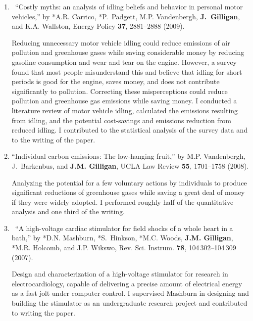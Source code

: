 \begin{enumerate}
\begin{credit}
	  \end{credit}
%	
	\item
	\textdagger\ 
	\enquote{Costly myths: an analysis of idling beliefs and behavior in personal
	  motor vehicles,}  by *A.R. Carrico, *P.~Padgett, M.P. Vandenbergh,
	  \textbf{J.~Gilligan}, and K.A. Wallston, Energy Policy \textbf{37}, 2881--2888
	  (2009).  
	  \begin{credit}
	  Reducing unnecessary motor vehicle idling could reduce emissions of air pollution and greenhouse gases while saving considerable money by reducing gasoline consumption and wear and tear on the engine. However, a survey found that most people misunderstand this and believe that idling for short periods is good for the engine, saves money, and does not contribute significantly to pollution. Correcting these misperceptions could reduce pollution and greenhouse gas emissions while saving money.	  I conducted a literature review of motor vehicle idling, calculated the emissions resulting from idling, and the potential cost-savings and emissions reduction from reduced idling. I contributed to the statistical analysis of the survey data and to the writing of the paper.
	  \end{credit}
%	
	\item
	\enquote{Individual carbon emissions: The low-hanging fruit,}  by M.P.
	  Vandenbergh, J.~Barkenbus, and \textbf{J.M. Gilligan}, UCLA Law Review \textbf{55},
	  1701--1758 (2008).  
	  \begin{credit}
	  Analyzing the potential for a few voluntary actions by individuals to produce significant reductions of greenhouse gases while saving a great deal of money if they were widely adopted.
	  I performed roughly half of the quantitative analysis and one third of the writing.
	  \end{credit}
%	
	\item
	\textdagger\ 
	\enquote{A high-voltage cardiac stimulator for field shocks of a whole heart in
	  a bath,}  by *D.N. Mashburn, *S.~Hinkson, *M.C. Woods, \textbf{J.M. Gilligan}, *M.R.
	  Holcomb, and J.P. Wikswo, Rev. Sci. Instrum. \textbf{78}, 104\,302--104\,309
	  (2007).  
	  \begin{credit}
	  Design and characterization of a high-voltage stimulator for research in electrocardiology, capable of delivering a precise amount of electrical energy as a fast jolt under computer control.
	  I supervised Mashburn in designing and building the stimulator as an undergraduate research project and contributed to writing the paper.
	  \end{credit}

\end{enumerate}

